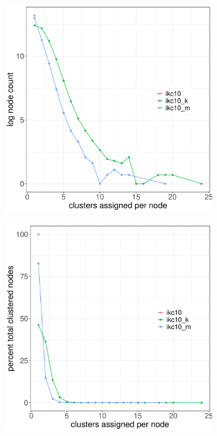 \documentclass[12pt, oneside]{article}   	%
\begin{document}
{\begin{figure}[H]
\centering
\begin{subfigure}[t]{0.48\textwidth}
\centering
\includegraphics[width=\linewidth]{fig2a.pdf} 
\end{subfigure}
\hfill
\begin{subfigure}[t]{0.48\textwidth}
\centering
\includegraphics[width=\linewidth]{fig2b.pdf} 

\end{subfigure}
\end{figure}}
\end{document}
